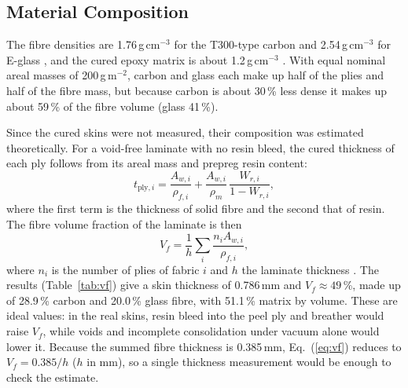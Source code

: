 \documentclass[11pt,a4paper]{article}
\newenvironment{addedblock}{\color{addgreen}}{}
\newenvironment{addedblock}{}{}
\begin{document}
\begin{addedblock}
\subsection{Material Composition}
\label{sec:composition}

The fibre densities are 1.76\,g\,cm$^{-3}$ for the T300-type carbon
\citep{toray_t300} and 2.54\,g\,cm$^{-3}$ for E-glass
\citep{mallick2007}, and the cured epoxy matrix is about
1.2\,g\,cm$^{-3}$ \citep{mallick2007}. With equal nominal areal masses
of 200\,g\,m$^{-2}$, carbon and glass each make up half of the plies
and half of the fibre mass, but because carbon is about 30\,\% less
dense it makes up about 59\,\% of the fibre volume (glass 41\,\%).

Since the cured skins were not measured, their composition was
estimated theoretically. For a void-free laminate with no resin bleed,
the cured thickness of each ply follows from its areal mass and
prepreg resin content:
\begin{equation}
    t_{\mathrm{ply},i} = \frac{A_{w,i}}{\rho_{f,i}}
    + \frac{A_{w,i}}{\rho_m}\,\frac{W_{r,i}}{1-W_{r,i}},
    \label{eq:cpt}
\end{equation}
where the first term is the thickness of solid fibre and the second
that of resin. The fibre volume fraction of the laminate is then
\begin{equation}
    V_f = \frac{1}{h}\sum_i \frac{n_i A_{w,i}}{\rho_{f,i}},
    \label{eq:vf}
\end{equation}
where $n_i$ is the number of plies of fabric $i$ and $h$ the laminate
thickness \citep{astm_d3171}. The results (Table~\ref{tab:vf}) give a
skin thickness of 0.786\,mm and $V_f \approx 49$\,\%, made up of
28.9\,\% carbon and 20.0\,\% glass fibre, with 51.1\,\% matrix by
volume. These are ideal values: in the real skins, resin bleed into the
peel ply and breather would raise $V_f$, while voids and incomplete
consolidation under vacuum alone would lower it. Because the summed
fibre thickness is 0.385\,mm, Eq.~(\ref{eq:vf}) reduces to
$V_f = 0.385/h$ ($h$ in mm), so a single thickness measurement would
be enough to check the estimate.
\end{addedblock}
\end{document}
